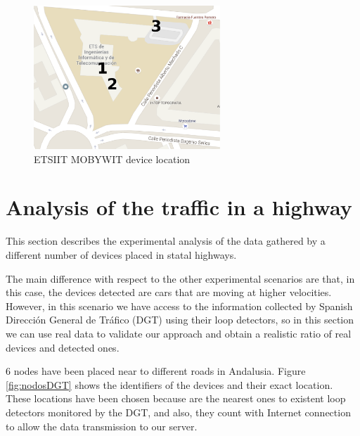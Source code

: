 \documentclass[preprint]{elsarticle}
\begin{document}
\begin{figure}[ht]
	\begin{center}
		\includegraphics[width=7cm]{imgs/ETSIIT/etsiit_nodes.eps}
		\caption{ETSIIT MOBYWIT device location}
		\label{fig:etsiit}
	\end{center}
\end{figure}


\section{Analysis of the traffic in a highway}
\label{sec:traffic}

This section describes the experimental analysis of the data gathered by a different number of devices placed in statal highways.

The main difference with respect to the other experimental scenarios are that, in this case, the devices detected are cars that are moving at higher velocities. However, in this scenario we have access to the information collected by Spanish Direcci\'on General de Tr\'afico (DGT) using their loop detectors, so in this section we can use real data to validate our approach and obtain a realistic ratio of real devices and detected ones.

6 nodes have been placed near to different roads in Andalusia. Figure \ref{fig:nodosDGT} shows the identifiers of the devices and their exact location. These locations have been chosen because are the nearest ones to existent loop detectors monitored by the DGT, and also, they count with Internet connection to allow the data transmission to our server.
\end{document}
